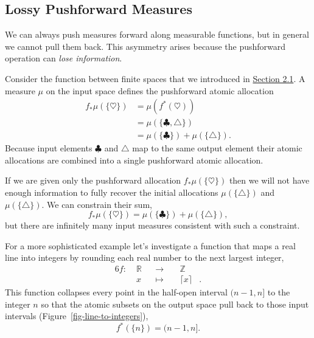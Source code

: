 \documentclass[
  letterpaper,
  DIV=11,
  numbers=noendperiod]{scrartcl}
\begin{document}
\hypertarget{lossy-pushforward-measures}{%
\subsection{Lossy Pushforward
Measures}\label{lossy-pushforward-measures}}

We can always push measures forward along measurable functions, but in
general we cannot pull them back. This asymmetry arises because the
pushforward operation can \emph{lose information}.

Consider the function between finite spaces that we introduced in
\href{@sec:terminology}{Section 2.1}. A measure \(\mu\) on the input
space defines the pushforward atomic allocation \begin{align*}
f_{*} \mu( \{ \heartsuit \} )
&=
\mu( f^{*}(\heartsuit) )
\\
&=
\mu( \{ \clubsuit, \triangle \} )
\\
&=
\mu( \{ \clubsuit \} ) + \mu( \{ \triangle \} ).
\end{align*} Because input elements \(\clubsuit\) and \(\triangle\) map
to the same output element their atomic allocations are combined into a
single pushforward atomic allocation.

If we are given only the pushforward allocation
\(f_{*} \mu( \{ \heartsuit \} )\) then we will not have enough
information to fully recover the initial allocations
\(\mu( \{ \triangle \} )\) and \(\mu( \{ \triangle \} )\). We can
constrain their sum, \[
f_{*} \mu( \{ \heartsuit \} )
=
\mu( \{ \clubsuit \} ) + \mu( \{ \triangle \} ),
\] but there are infinitely many input measures consistent with such a
constraint.

For a more sophisticated example let's investigate a function that maps
a real line into integers by rounding each real number to the next
largest integer, \begin{alignat*}{6}
f :\; & \mathbb{R} & &\rightarrow& \; & \mathbb{Z} &
\\
& x & &\mapsto& & \lceil x \rceil  &.
\end{alignat*} This function collapses every point in the half-open
interval \((n - 1, n]\) to the integer \(n\) so that the atomic subsets
on the output space pull back to those input intervals
(Figure~\ref{fig-line-to-integers}), \[
f^{*}( \{ n \} ) = (n - 1, n].
\]
\end{document}
